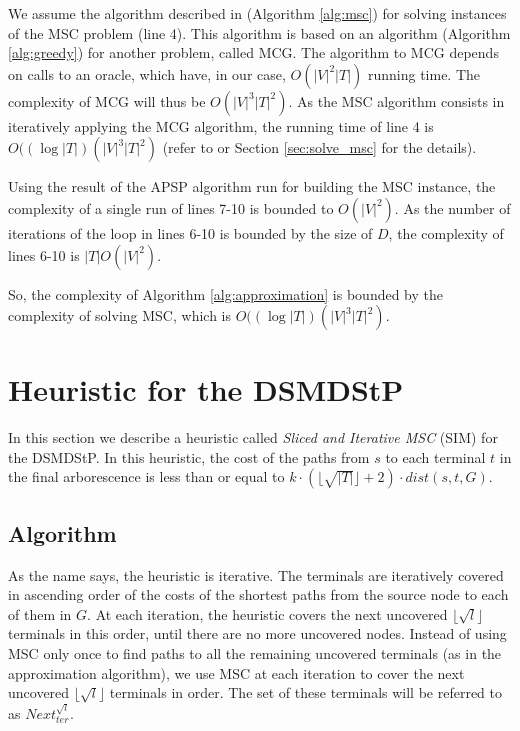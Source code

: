 We assume the algorithm described in \cite{Chekuri2004} (Algorithm \ref{alg:msc}) for solving instances of the MSC problem (line 4).
This algorithm is based on an algorithm (Algorithm \ref{alg:greedy}) for another problem, called MCG. The algorithm to MCG depends
on calls to an oracle, which have, in our case, $O(|V|^2|T|)$ running time. The complexity of MCG will
thus be $O(|V|^3|T|^2)$. As the MSC algorithm 
consists in iteratively applying the MCG algorithm, the running time of line 4 is $O((\log{|T|})(|V|^3|T|^2)$
(refer to \cite{Chekuri2004} or Section \ref{sec:solve_msc} for the details).

Using the result of the APSP algorithm run for building the MSC instance, the complexity of a single run of 
lines 7-10 is bounded to $O(|V|^2)$. As the number of iterations of the loop in lines 6-10 is bounded by the size of $D$,
the complexity of lines 6-10 is $|T|O(|V|^2)$.

So, the complexity of Algorithm \ref{alg:approximation} is bounded by the complexity of solving MSC, 
which is $O((\log{|T|})(|V|^3|T|^2)$.

\section{Heuristic for the DSMDStP}
\label{sec:heuristic}

In this section we describe a heuristic called \emph{Sliced and Iterative MSC} (SIM) for the DSMDStP. In this heuristic, the 
cost of the paths from $s$ to each terminal $t$ in the final arborescence is less than or equal to $k \cdot (\lfloor\sqrt{|T|}\rfloor+2) \cdot dist(s,t,G)$.

\subsection{Algorithm}
\label{sec:heuristic-description}

As the name says, the heuristic is iterative. The terminals are iteratively covered in ascending order of the costs of the shortest paths  
from the source node to each of them in $G$. At each iteration, the heuristic covers the next uncovered $\lfloor\sqrt{l}\rfloor$ terminals in this order,
until there are no more uncovered nodes. 
Instead of using MSC only once to find paths to all the remaining uncovered terminals (as in the approximation algorithm), we use MSC at each iteration to cover the 
next uncovered $\lfloor\sqrt{l}\rfloor$ terminals in order. The set of these terminals will be referred to as $Next^{\sqrt{l}}_{ter}$. 

